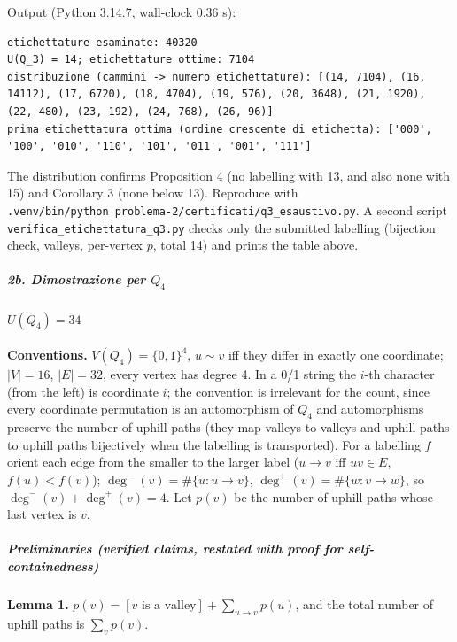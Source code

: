 \documentclass[11pt,a4paper]{article}
\begin{document}
Output (Python 3.14.7, wall-clock 0.36 s):

\begin{verbatim}
etichettature esaminate: 40320
U(Q_3) = 14; etichettature ottime: 7104
distribuzione (cammini -> numero etichettature): [(14, 7104), (16, 14112), (17, 6720), (18, 4704), (19, 576), (20, 3648), (21, 1920), (22, 480), (23, 192), (24, 768), (26, 96)]
prima etichettatura ottima (ordine crescente di etichetta): ['000', '100', '010', '110', '101', '011', '001', '111']
\end{verbatim}

The distribution confirms Proposition 4 (no labelling with 13, and also
none with 15) and Corollary 3 (none below 13). Reproduce with
\texttt{.venv/bin/python\ problema-2/certificati/q3\_esaustivo.py}. A
second script \texttt{verifica\_etichettatura\_q3.py} checks only the
submitted labelling (bijection check, valleys, per-vertex \(p\), total
14) and prints the table above.

\subparagraph{\texorpdfstring{2b. Dimostrazione per
\(Q_4\)}{2b. Dimostrazione per Q\_4}}\label{b.-dimostrazione-per-q_4}

\paragraph{\texorpdfstring{\(U(Q_4)=34\)}{U(Q\_4)=34}}\label{uq_434}

\textbf{Conventions.} \(V(Q_4)=\{0,1\}^4\), \(u\sim v\) iff they differ
in exactly one coordinate; \(|V|=16\), \(|E|=32\), every vertex has
degree 4. In a 0/1 string the \(i\)-th character (from the left) is
coordinate \(i\); the convention is irrelevant for the count, since
every coordinate permutation is an automorphism of \(Q_4\) and
automorphisms preserve the number of uphill paths (they map valleys to
valleys and uphill paths to uphill paths bijectively when the labelling
is transported). For a labelling \(f\) orient each edge from the smaller
to the larger label (\(u\to v\) iff \(uv\in E\), \(f(u)<f(v)\));
\(\deg^-(v)=\#\{u:u\to v\}\), \(\deg^+(v)=\#\{w: v\to w\}\), so
\(\deg^-(v)+\deg^+(v)=4\). Let \(p(v)\) be the number of uphill paths
whose last vertex is \(v\).

\subparagraph{Preliminaries (verified claims, restated with proof for
self-containedness)}\label{preliminaries-verified-claims-restated-with-proof-for-self-containedness}

\textbf{Lemma 1.} \(p(v)=[v\text{ is a valley}]+\sum_{u\to v}p(u)\), and
the total number of uphill paths is \(\sum_v p(v)\).
\end{document}
